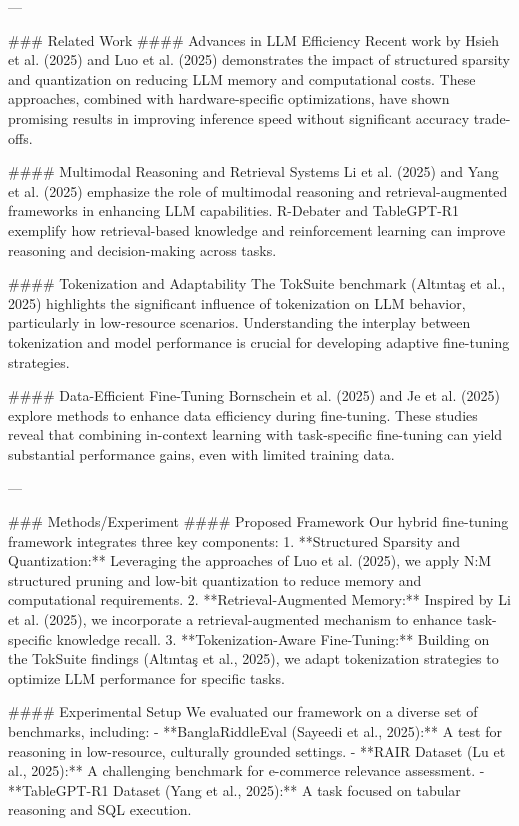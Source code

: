 ---

### Related Work  
#### Advances in LLM Efficiency  
Recent work by Hsieh et al. (2025) and Luo et al. (2025) demonstrates the impact of structured sparsity and quantization on reducing LLM memory and computational costs. These approaches, combined with hardware-specific optimizations, have shown promising results in improving inference speed without significant accuracy trade-offs.

#### Multimodal Reasoning and Retrieval Systems  
Li et al. (2025) and Yang et al. (2025) emphasize the role of multimodal reasoning and retrieval-augmented frameworks in enhancing LLM capabilities. R-Debater and TableGPT-R1 exemplify how retrieval-based knowledge and reinforcement learning can improve reasoning and decision-making across tasks.

#### Tokenization and Adaptability  
The TokSuite benchmark (Altıntaş et al., 2025) highlights the significant influence of tokenization on LLM behavior, particularly in low-resource scenarios. Understanding the interplay between tokenization and model performance is crucial for developing adaptive fine-tuning strategies.

#### Data-Efficient Fine-Tuning  
Bornschein et al. (2025) and Je et al. (2025) explore methods to enhance data efficiency during fine-tuning. These studies reveal that combining in-context learning with task-specific fine-tuning can yield substantial performance gains, even with limited training data.

---

### Methods/Experiment  
#### Proposed Framework  
Our hybrid fine-tuning framework integrates three key components:  
1. **Structured Sparsity and Quantization:** Leveraging the approaches of Luo et al. (2025), we apply N:M structured pruning and low-bit quantization to reduce memory and computational requirements.  
2. **Retrieval-Augmented Memory:** Inspired by Li et al. (2025), we incorporate a retrieval-augmented mechanism to enhance task-specific knowledge recall.  
3. **Tokenization-Aware Fine-Tuning:** Building on the TokSuite findings (Altıntaş et al., 2025), we adapt tokenization strategies to optimize LLM performance for specific tasks.

#### Experimental Setup  
We evaluated our framework on a diverse set of benchmarks, including:  
- **BanglaRiddleEval (Sayeedi et al., 2025):** A test for reasoning in low-resource, culturally grounded settings.  
- **RAIR Dataset (Lu et al., 2025):** A challenging benchmark for e-commerce relevance assessment.  
- **TableGPT-R1 Dataset (Yang et al., 2025):** A task focused on tabular reasoning and SQL execution.

